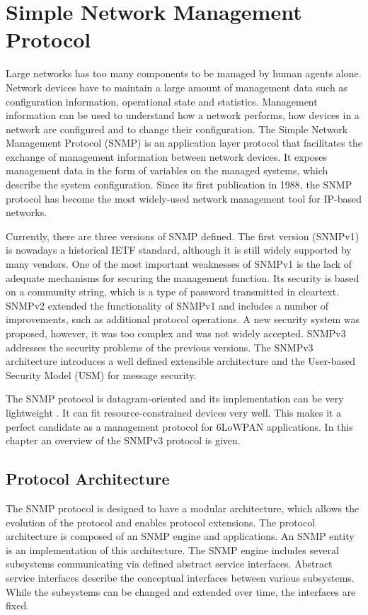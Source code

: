 \chapter{Simple Network Management Protocol}\label{ch:snmp}
Large networks has too many components to be managed by human agents alone. Network devices have to maintain a large amount of management data such as configuration information,  operational state and statistics. Management information can be used to understand how a network performs, how devices in a network are configured and to change their configuration. The Simple Network Management Protocol (SNMP) \cite{rfc3410} is an application layer protocol that facilitates the exchange of management information between network devices. It exposes management data in the form of variables on the managed systems, which describe the system configuration. Since its first publication in 1988, the SNMP protocol has become the most widely-used network management tool for IP-based networks.

Currently, there are three versions of SNMP defined. The first version (SNMPv1) is nowadays a historical IETF standard, although it is still widely supported by many vendors. One of the most important weaknesses of SNMPv1 is the lack of adequate mechanisms for securing the management function. Its security is based on a community string, which is a type of password transmitted in cleartext. SNMPv2 extended the functionality of SNMPv1 and includes a number of improvements, such as additional protocol operations. A new security system was proposed, however, it was too complex and was not widely accepted. SNMPv3 addresses the security problems of the previous versions. The SNMPv3 architecture introduces a well defined extensible architecture and the User-based Security Model (USM) for message security.

The SNMP protocol is datagram-oriented and its implementation can be very lightweight \cite{draft-6lowpan-snmp}. It can fit resource-constrained devices very well. This makes it a perfect candidate as a management protocol for 6LoWPAN applications. In this chapter an overview of the SNMPv3 protocol is given.

\section{Protocol Architecture}
The SNMP protocol is designed to have a modular architecture, which allows the evolution of the protocol and enables protocol extensions. The protocol architecture is composed of an SNMP engine and applications. An SNMP entity is an implementation of this architecture. The SNMP engine includes several subsystems communicating via defined abstract service interfaces. Abstract service interfaces describe the conceptual interfaces between various subsystems.  While the subsystems can be changed and extended over time, the interfaces are fixed.

